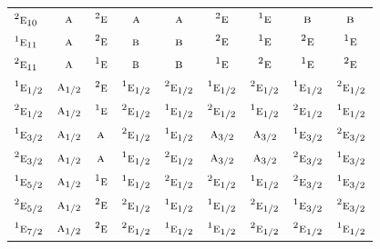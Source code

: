 \documentclass[10pt,a4paper]{article}
\numberwithin{equation}{section}
\newcommand{\irr}[1]{\text{\normalfont\scshape #1}}
\newcommand{\conjpair}[1]{{}^{#1}}
\begin{document}
{\begin{longtable}{@{}lcccccccc@{}}
$\conjpair{2}\irr{e}_{10}$ & $\irr{a}$ & $\conjpair{2}\irr{e}$ & $\irr{a}$ & $\irr{a}$ & $\conjpair{2}\irr{e}$ & $\conjpair{1}\irr{e}$ & $\irr{b}$ & $\irr{b}$\\
$\conjpair{1}\irr{e}_{11}$ & $\irr{a}$ & $\conjpair{2}\irr{e}$ & $\irr{b}$ & $\irr{b}$ & $\conjpair{2}\irr{e}$ & $\conjpair{1}\irr{e}$ & $\conjpair{2}\irr{e}$ & $\conjpair{1}\irr{e}$\\
$\conjpair{2}\irr{e}_{11}$ & $\irr{a}$ & $\conjpair{1}\irr{e}$ & $\irr{b}$ & $\irr{b}$ & $\conjpair{1}\irr{e}$ & $\conjpair{2}\irr{e}$ & $\conjpair{1}\irr{e}$ & $\conjpair{2}\irr{e}$\\
$\conjpair{1}\irr{e}_{1/2}$ & $\irr{a}_{1/2}$ & $\conjpair{2}\irr{e}$ & $\conjpair{1}\irr{e}_{1/2}$ & $\conjpair{2}\irr{e}_{1/2}$ & $\conjpair{1}\irr{e}_{1/2}$ & $\conjpair{2}\irr{e}_{1/2}$ & $\conjpair{1}\irr{e}_{1/2}$ & $\conjpair{2}\irr{e}_{1/2}$\\
$\conjpair{2}\irr{e}_{1/2}$ & $\irr{a}_{1/2}$ & $\conjpair{1}\irr{e}$ & $\conjpair{2}\irr{e}_{1/2}$ & $\conjpair{1}\irr{e}_{1/2}$ & $\conjpair{2}\irr{e}_{1/2}$ & $\conjpair{1}\irr{e}_{1/2}$ & $\conjpair{2}\irr{e}_{1/2}$ & $\conjpair{1}\irr{e}_{1/2}$\\
$\conjpair{1}\irr{e}_{3/2}$ & $\irr{a}_{1/2}$ & $\irr{a}$ & $\conjpair{2}\irr{e}_{1/2}$ & $\conjpair{1}\irr{e}_{1/2}$ & $\irr{a}_{3/2}$ & $\irr{a}_{3/2}$ & $\conjpair{1}\irr{e}_{3/2}$ & $\conjpair{2}\irr{e}_{3/2}$\\
$\conjpair{2}\irr{e}_{3/2}$ & $\irr{a}_{1/2}$ & $\irr{a}$ & $\conjpair{1}\irr{e}_{1/2}$ & $\conjpair{2}\irr{e}_{1/2}$ & $\irr{a}_{3/2}$ & $\irr{a}_{3/2}$ & $\conjpair{2}\irr{e}_{3/2}$ & $\conjpair{1}\irr{e}_{3/2}$\\
$\conjpair{1}\irr{e}_{5/2}$ & $\irr{a}_{1/2}$ & $\conjpair{1}\irr{e}$ & $\conjpair{1}\irr{e}_{1/2}$ & $\conjpair{2}\irr{e}_{1/2}$ & $\conjpair{2}\irr{e}_{1/2}$ & $\conjpair{1}\irr{e}_{1/2}$ & $\conjpair{2}\irr{e}_{3/2}$ & $\conjpair{1}\irr{e}_{3/2}$\\
$\conjpair{2}\irr{e}_{5/2}$ & $\irr{a}_{1/2}$ & $\conjpair{2}\irr{e}$ & $\conjpair{2}\irr{e}_{1/2}$ & $\conjpair{1}\irr{e}_{1/2}$ & $\conjpair{1}\irr{e}_{1/2}$ & $\conjpair{2}\irr{e}_{1/2}$ & $\conjpair{1}\irr{e}_{3/2}$ & $\conjpair{2}\irr{e}_{3/2}$\\
$\conjpair{1}\irr{e}_{7/2}$ & $\irr{a}_{1/2}$ & $\conjpair{2}\irr{e}$ & $\conjpair{2}\irr{e}_{1/2}$ & $\conjpair{1}\irr{e}_{1/2}$ & $\conjpair{1}\irr{e}_{1/2}$ & $\conjpair{2}\irr{e}_{1/2}$ & $\conjpair{2}\irr{e}_{1/2}$ & $\conjpair{1}\irr{e}_{1/2}$\\

\end{longtable}}
\end{document}

